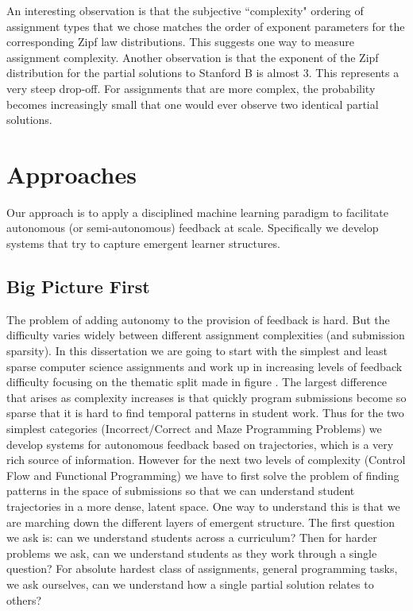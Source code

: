  An interesting observation is that the subjective ``complexity" ordering of assignment types that we chose matches the order of exponent parameters for the corresponding Zipf law distributions. This suggests one way to measure assignment complexity. Another observation is that the exponent of the Zipf distribution for the partial solutions to Stanford B is almost 3. This represents a very steep drop-off. For assignments that are more complex, the probability becomes increasingly small that one would ever observe two identical partial solutions.

\section{Approaches}

Our approach is to apply a disciplined machine learning paradigm to facilitate autonomous (or semi-autonomous) feedback at scale. Specifically we develop systems that try to capture emergent learner structures. 

\subsection{Big Picture First}

The problem of adding autonomy to the provision of feedback is hard. But the difficulty varies widely between different assignment complexities (and submission sparsity). In this dissertation we are going to start with the simplest and least sparse computer science assignments and work up in increasing levels of feedback difficulty focusing on the thematic split made in figure \cite{fig:assnTypes}. The largest difference that arises as complexity increases is that quickly program submissions become so sparse that it is hard to find temporal patterns in student work. Thus for the two simplest categories (Incorrect/Correct and Maze Programming Problems) we develop systems for autonomous feedback based on trajectories, which is a very rich source of information. However for the next two levels of complexity (Control Flow and Functional Programming) we have to first solve the problem of finding patterns in the space of submissions so that we can understand student trajectories in a more dense, latent space. One way to understand this is that we are marching down the different layers of emergent structure. The first question we ask is: can we understand students across a curriculum? Then for harder problems we ask, can we understand students as they work through a single question? For absolute hardest class of assignments, general programming tasks, we ask ourselves, can we understand how a single partial solution relates to others?

